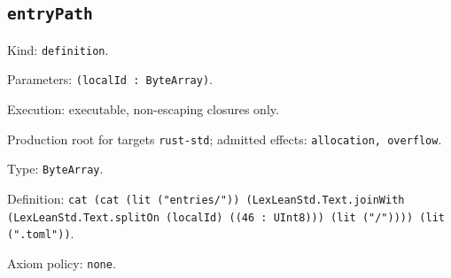 \documentclass[11pt]{article}
\begin{document}
\subsection*{\texttt{entryPath}}
\noindent Kind: \texttt{definition}.\par
\noindent Parameters: \texttt{(localId : ByteArray)}.\par
\noindent Execution: executable, non-escaping closures only.\par
\noindent Production root for targets \texttt{rust-std}; admitted effects: \texttt{allocation, overflow}.\par
\noindent Type: \texttt{ByteArray}.\par
\noindent Definition: \texttt{cat (cat (lit ("entries/")) (LexLeanStd.Text.joinWith (LexLeanStd.Text.splitOn (localId) ((46 : UInt8))) (lit ("/")))) (lit (".toml"))}.\par
\noindent Axiom policy: \texttt{none}.\par
\end{document}
